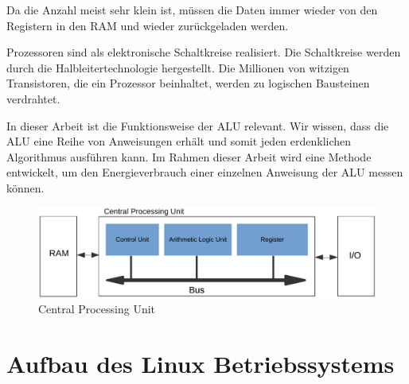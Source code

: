 Da die Anzahl meist sehr klein ist, müssen die Daten immer wieder von den Registern in den RAM und wieder zurückgeladen werden.
\par
Prozessoren sind als elektronische Schaltkreise realisiert. Die Schaltkreise werden durch die Halbleitertechnologie hergestellt. Die Millionen von witzigen Transistoren, die ein Prozessor beinhaltet, werden zu logischen Bausteinen verdrahtet.
\par
In dieser Arbeit ist die Funktionsweise der ALU relevant. Wir wissen, dass die ALU eine Reihe von Anweisungen erhält und somit jeden erdenklichen Algorithmus ausführen kann. Im Rahmen dieser Arbeit wird eine Methode entwickelt, um den Energieverbrauch einer einzelnen Anweisung der ALU messen können.

\begin{figure}[t]
\centering
\includegraphics[width=1.0\textwidth]{images/cpu.pdf}
\caption{Central Processing Unit}
\label{fig:CPU}
\end{figure}

\section{Aufbau des Linux Betriebssystems}

